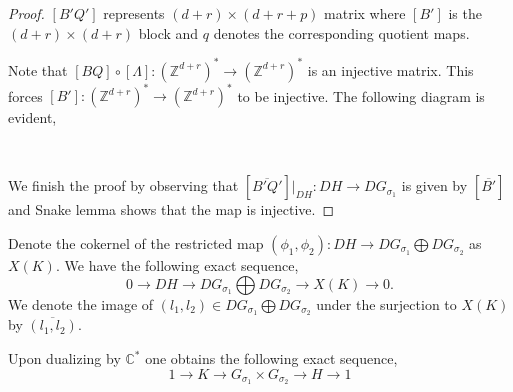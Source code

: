 \documentclass[10pt]{amsart}
\newcommand{\sX}{{\mathcal X}}
\numberwithin{equation}{subsection}
\begin{document}
\begin{proof}
$[B'Q']$ represents $(d+r)\times (d+r+p)$ matrix where $[B']$ is the $(d+r)\times (d+r)$ block and $q$ denotes the corresponding quotient maps. \par Note that $[BQ]\circ [\Lambda]:(\mathbb{Z}^{d+r})^{*}\to (\mathbb{Z}^{d+r})^{*}$ is an injective matrix. This forces $[B']:(\mathbb{Z}^{d+r})^*\to (\mathbb{Z}^{d+r})^*$ to be injective. The following diagram is evident,
\begin{center}
~~~~~~
\end{center}
We finish the proof by observing that $[\overline{B'Q'}]|_{DH}:DH\to DG_{\sigma_1}$ is given by $[\overline{B'}]$ and Snake lemma shows that the map is injective.
\end{proof}
Denote the cokernel of the restricted map $(\phi_1,\phi_2):DH\to DG_{\sigma_1}\bigoplus DG_{\sigma_2} $ as $X(K).$ We have the following exact sequence,
\begin{equation}\label{cokernel}
0\to DH\to DG_{\sigma_1}\bigoplus DG_{\sigma_2}\to X(K)\to 0.    
\end{equation}
We denote the image of $(l_1,l_2)\in DG_{\sigma_1}\bigoplus DG_{\sigma_2}$ under the surjection to $X(K)$ by $\overline{(l_1,l_2)}$.\par  Upon dualizing by $\mathbb{C}^{*}$ one obtains the following exact sequence,
\begin{equation}\label{eq:reduction}
1 \to K \to  G_{\sigma_1}\times G_{\sigma_2} \to H \to 1
\end{equation} \par
\end{document}
